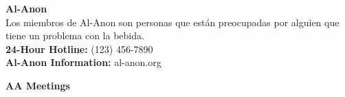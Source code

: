\documentclass[11pt,twoside,letterpaper]{article}
\def\7pt{\fontsize{7}{8}\selectfont}
\def\8pt{\fontsize{8.5}{10}\selectfont}
\begin{document}
  \begin{minipage}[r][\dimexpr 0.485\textheight][t]{\dimexpr 0.485\textwidth}
    {\textbf{Al-Anon}}\hrulefill\\
{\7pt Los miembros de Al-Anon son personas que están preocupadas por alguien que tiene un problema con la bebida.}\\
{\7pt\textbf{24-Hour Hotline:} (123) 456-7890}\\
{\7pt\textbf{Al-Anon Information:} al-anon.org}


  \end{minipage}

  \pagebreak


    {\textbf{AA Meetings}}\hrulefill
\end{document}
